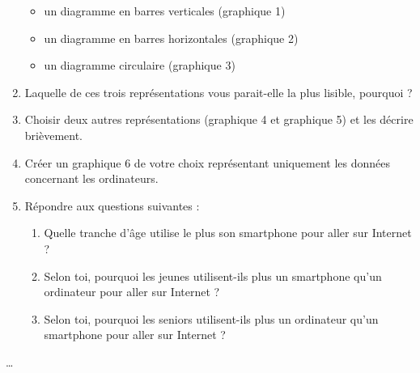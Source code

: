\begin{enigme}[Le tableur]
\begin{enumerate}
\begin{itemize}
            \item un diagramme en barres verticales (graphique 1)
            \item un diagramme en barres horizontales (graphique 2)
            \item un diagramme circulaire (graphique 3)
       \end{itemize}
       \item Laquelle de ces trois représentations vous parait-elle la plus lisible, pourquoi ?
       \item Choisir deux autres représentations (graphique 4 et graphique 5) et les décrire brièvement.
       \item Créer un graphique 6 de votre choix représentant uniquement les données concernant les ordinateurs.
       \item Répondre aux questions suivantes :
          \begin{enumerate}
             \item Quelle tranche d'âge utilise le plus son smartphone pour aller sur Internet ? 
             \item Selon toi, pourquoi \og les jeunes \fg{} utilisent-ils plus un smartphone qu'un ordinateur pour aller sur Internet ?                
             \item Selon toi, pourquoi \og les seniors \fg{} utilisent-ils plus un ordinateur qu'un smartphone pour aller sur Internet ?
          \end{enumerate}
    \end{enumerate}
    \dotfill\par
    \dotfill\par
    \dotfill\par
    \dotfill\par
    \dotfill\par
    \dotfill\par    
 \end{enigme}
 
 

\addtocounter{exercice}{-1}
\begin{corrige}
    \ldots
\end{corrige}